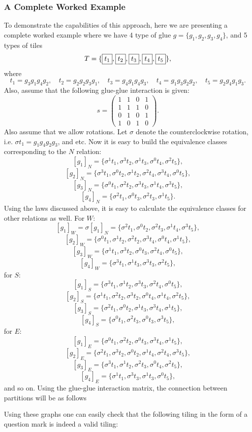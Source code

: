 \documentclass[11pt,a4paper]{article}
\newcommand{\tile}[1]{\fbox{\ensuremath{#1}}}
\theoremstyle{definition}
\theoremstyle{remark}
\theoremstyle{definition}
\begin{document}
 	
 	\subsubsection{A Complete Worked Example}
 	
 	To demonstrate the capabilities of this approach, here we are presenting a complete worked example where we have 4 type of glue $ g = \{g_1,g_2,g_3,g_4\} $, and 5 types of tiles
 	\[ T = \{ \tile{t_1},\tile{t_2},\tile{t_3},\tile{t_4},\tile{t_5} \}, \]
 	where
 	\[ t_1=g_3g_1g_4g_2,\quad t_2=g_2g_2g_3g_1,\quad t_3=g_4g_1g_4g_3,\quad t_4=g_1g_3g_2g_2,\quad t_5=g_2g_4g_1g_3. \]
 	Also, assume that the following glue-glue interaction is given:
 	\[ 
 	s = \begin{pmatrix}
 		1 & 1 & 0 & 1\\
 		1 & 1 & 1 & 0\\
 		0 & 1 & 0 & 1\\
 		1 & 0 & 1 & 0
 	\end{pmatrix}.
 	 \]
 	Also assume that we allow rotations. Let $ \sigma $ denote the counterclockwise rotation, i.e. $ \sigma t_1 = g_1g_4g_2g_3 $, and etc. Now it is easy to build the equivalence classes corresponding to the $ N $ relation:
 	\[ [g_1]_N = \{ \sigma^1t_1, \sigma^3t_2, \sigma^1t_3, \sigma^0t_4, \sigma^2t_5 \}, \]
 	\[ [g_2]_N = \{ \sigma^3t_1, \sigma^0t_2, \sigma^1t_2, \sigma^2t_4, \sigma^3t_4, \sigma^0t_5\}, \]
 	\[ [g_3]_N = \{ \sigma^0t_1, \sigma^2t_2, \sigma^3t_3, \sigma^1t_4, \sigma^3t_5 \}, \]
 	\[ [g_4]_N = \{ \sigma^2t_1, \sigma^0t_3, \sigma^2t_3, \sigma^1t_5 \}. \]
 	Using the laws discussed above, it is easy to calculate the equivalence classes for other relations as well. For $ W $:
 	\[ [g_1]_W = \sigma [g_1]_N = \{ \sigma^2t_1, \sigma^0t_2, \sigma^2t_3, \sigma^1t_4, \sigma^3t_5 \}, \]
 	\[ [g_2]_W = \{ \sigma^0t_1, \sigma^1t_2, \sigma^2t_2, \sigma^3t_4, \sigma^0t_4, \sigma^1t_5\}, \]
 	\[ [g_3]_W  = \{ \sigma^1t_1, \sigma^3t_2, \sigma^0t_3, \sigma^2t_4, \sigma^0t_5 \},  \]
 	\[ [g_4]_W = \{ \sigma^3t_1, \sigma^1t_3, \sigma^3t_3, \sigma^2t_5 \}, \]
 	for $ S $:
 	\[ [g_1]_S = \{ \sigma^3t_1, \sigma^1t_2, \sigma^3t_3, \sigma^2t_4, \sigma^0t_5 \}, \]
 	\[ [g_2]_S = \{ \sigma^1t_1, \sigma^2t_2, \sigma^3t_2, \sigma^0t_4, \sigma^1t_4, \sigma^2t_5\}, \]
 	\[ [g_3]_S  = \{ \sigma^2t_1, \sigma^0t_2, \sigma^1t_3, \sigma^3t_4, \sigma^1t_5 \},  \]
 	\[ [g_4]_S = \{ \sigma^0t_1, \sigma^2t_3, \sigma^0t_3, \sigma^3t_5 \}, \]
 	for $ E $:
 	\[ [g_1]_E = \{ \sigma^0t_1, \sigma^2t_2, \sigma^0t_3, \sigma^3t_4, \sigma^1t_5 \}, \]
 	\[ [g_2]_E = \{ \sigma^2t_1, \sigma^3t_2, \sigma^0t_2, \sigma^1t_4, \sigma^2t_4, \sigma^3t_5\}, \]
 	\[ [g_3]_E  = \{ \sigma^3t_1, \sigma^1t_2, \sigma^2t_3, \sigma^0t_4, \sigma^2t_5 \},  \]
 	\[ [g_4]_E = \{ \sigma^1t_1, \sigma^3t_3, \sigma^1t_3, \sigma^0t_5 \}, \]
 	and so on. Using the glue-glue interaction matrix, the connection between partitions will be as follows
 	
 	\FloatBarrier
 	Using these graphs one can easily check that the following tiling in the form of a question mark is indeed a valid tiling:
 	
 	
\end{document}
